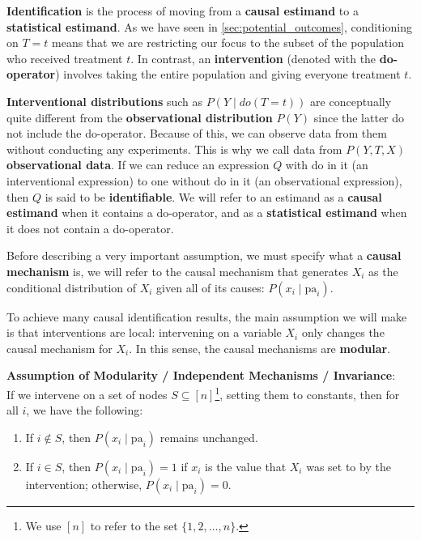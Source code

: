 \textbf{Identification} is the process of moving from a \textbf{causal estimand}
to a \textbf{statistical estimand}. As we have seen in \ref{sec:potential_outcomes},
conditioning on \( T = t \) means that we are restricting our focus to the subset
of the population who received treatment \( t \). In contrast, an \textbf{intervention}
(denoted with the \textbf{do-operator}) involves taking the entire population and
giving everyone treatment \( t \).

\textbf{Interventional distributions} such as \( P(Y \mid do(T = t)) \)
are conceptually quite different from the \textbf{observational distribution} \( P(Y) \)
since the latter do not include the do-operator.
Because of this, we can observe data from them without conducting any experiments.
This is why we call data from \( P(Y, T, X) \) \textbf{observational data}.
If we can reduce an expression \( Q \) with do in it (an interventional expression)
to one without do in it (an observational expression), then \( Q \) is said to be
\textbf{identifiable}. We will refer to an estimand as a
\textbf{causal estimand} when it contains a do-operator,
and as a \textbf{statistical estimand} when it does not contain a do-operator.

Before describing a very important assumption, we must specify what
a \textbf{causal mechanism} is,
we will refer to the causal mechanism that generates \( X_i \)
as the conditional distribution of \( X_i \) given all of
its causes: \( P(x_i \mid \text{pa}_i) \).

To achieve many causal identification results, the main assumption we will
make is that interventions are local:
intervening on a variable \( X_i \) only changes the causal mechanism for \( X_i \).
In this sense, the causal mechanisms are \textbf{modular}.

\textbf{Assumption of Modularity / Independent Mechanisms / Invariance}:\\
If we intervene on a set of nodes \( S \subseteq [n] \)\footnote{We use \( [n] \) to refer to the set \(\{1, 2, \ldots, n\}\).}, setting them to constants, then for all \( i \), we have the following:
\begin{enumerate}
    \item If \( i \notin S \), then \( P(x_i \mid \text{pa}_i) \) remains unchanged.
    \item If \( i \in S \), then \( P(x_i \mid \text{pa}_i) = 1 \) if \( x_i \)
    is the value that \( X_i \) was set to by the intervention; otherwise,
    \( P(x_i \mid \text{pa}_i) = 0 \).
\end{enumerate}


